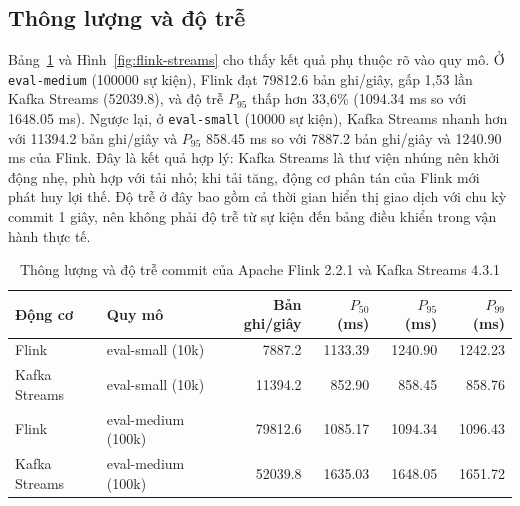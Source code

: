 \subsection{Thông lượng và độ trễ}
\label{sec:c5-thong-luong}
Bảng~\ref{tab:flink-streams} và Hình~\ref{fig:flink-streams} cho thấy kết quả phụ thuộc rõ vào quy mô. Ở \texttt{eval-medium} (\num{100000} sự kiện), Flink đạt \num{79812.6} bản ghi/giây, gấp 1,53 lần Kafka Streams (\num{52039.8}), và độ trễ $P_{95}$ thấp hơn 33,6\% (\num{1094.34} ms so với \num{1648.05} ms). Ngược lại, ở \texttt{eval-small} (\num{10000} sự kiện), Kafka Streams nhanh hơn với \num{11394.2} bản ghi/giây và $P_{95}$ \num{858.45} ms so với \num{7887.2} bản ghi/giây và \num{1240.90} ms của Flink. Đây là kết quả hợp lý: Kafka Streams là thư viện nhúng nên khởi động nhẹ, phù hợp với tải nhỏ; khi tải tăng, động cơ phân tán của Flink mới phát huy lợi thế. Độ trễ ở đây bao gồm cả thời gian hiển thị giao dịch với chu kỳ commit 1 giây, nên không phải độ trễ từ sự kiện đến bảng điều khiển trong vận hành thực tế.

\begin{table}[H]
\centering
\caption{Thông lượng và độ trễ commit của Apache Flink 2.2.1 và Kafka Streams 4.3.1}
\label{tab:flink-streams}
\small
\renewcommand{\arraystretch}{1.2}
\begin{tabular}{llrrrr}
\toprule
\textbf{Động cơ} & \textbf{Quy mô} & \textbf{Bản ghi/giây} & \textbf{$P_{50}$ (ms)} & \textbf{$P_{95}$ (ms)} & \textbf{$P_{99}$ (ms)} \\
\midrule
Flink & eval-small (10k) & \num{7887.2} & \num{1133.39} & \num{1240.90} & \num{1242.23} \\
Kafka Streams & eval-small (10k) & \num{11394.2} & \num{852.90} & \num{858.45} & \num{858.76} \\
Flink & eval-medium (100k) & \num{79812.6} & \num{1085.17} & \num{1094.34} & \num{1096.43} \\
Kafka Streams & eval-medium (100k) & \num{52039.8} & \num{1635.03} & \num{1648.05} & \num{1651.72} \\
\bottomrule
\end{tabular}
\end{table}


